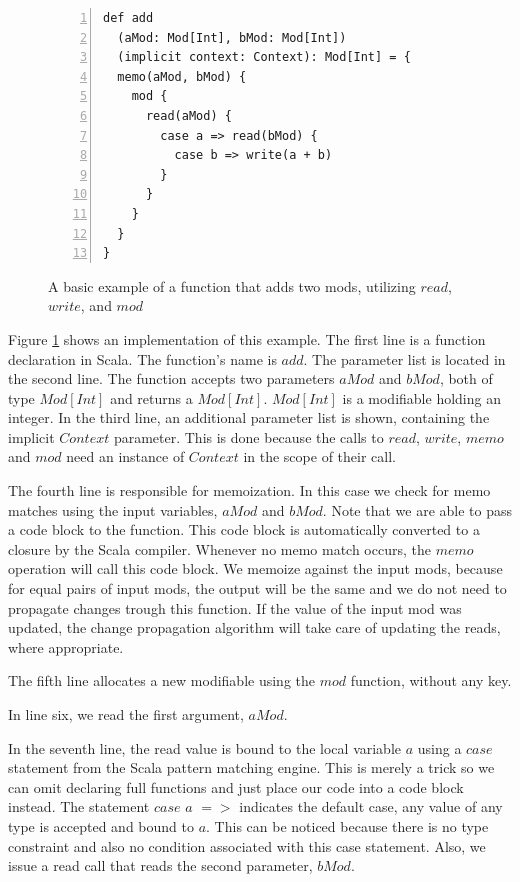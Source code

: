 \begin{figure}
\begin{lstlisting}[frame=single,basicstyle=\ttfamily,numbers=left]
def add
  (aMod: Mod[Int], bMod: Mod[Int])
  (implicit context: Context): Mod[Int] = {
  memo(aMod, bMod) {
    mod {
      read(aMod) {
        case a => read(bMod) {
          case b => write(a + b)
        }
      }
    }
  }
}
\end{lstlisting}
\caption{A basic example of a function that adds two mods, utilizing $read$, $write$, and $mod$}
\label{code:add_example}
\end{figure}

Figure \ref{code:add_example} shows an implementation of this example. The first line is a function declaration in Scala. The function's name is $add$. The parameter list is located in the second line. The function accepts two parameters $aMod$ and $bMod$, both of type $Mod[Int]$ and returns a $Mod[Int]$. $Mod[Int]$ is a modifiable holding an integer. In the third line, an additional parameter list is shown, containing the implicit $Context$ parameter. This is done because the calls to $read$, $write$, $memo$ and $mod$ need an instance of $Context$ in the scope of their call.

The fourth line is responsible for memoization. In this case we check for memo matches using the input variables, $aMod$ and $bMod$. Note that we are able to pass a code block to the function. This code block is automatically converted to a closure by the Scala compiler. Whenever no memo match occurs, the $memo$ operation will call this code block. We memoize against the input mods, because for equal pairs of input mods, the output will be the same and we do not need to propagate changes trough this function. If the value of the input mod was updated, the change propagation algorithm will take care of updating the reads, where appropriate. 

The fifth line allocates a new modifiable using the $mod$ function, without any key. 

In line six, we read the first argument, $aMod$. 

In the seventh line, the read value is bound to the local variable $a$ using a $case$ statement from the Scala pattern matching engine. This is merely a trick so we can omit declaring full functions and just place our code into a code block instead. The statement $case$ $a$ $=>$ indicates the default case, any value of any type is accepted and bound to $a$. This can be noticed because there is no type constraint and also no condition associated with this case statement. Also, we issue a read call that reads the second parameter, $bMod$.

